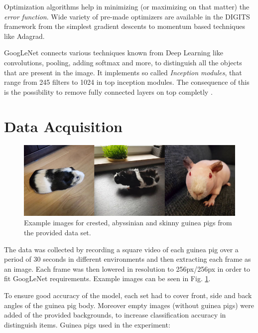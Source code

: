 \documentclass[10pt,journal,compsoc]{IEEEtran}
\begin{document}
    Optimization algorithms help in minimizing (or maximizing on that matter) the \textit{error function}. Wide variety of pre-made optimizers are available in the DIGITS framework from the simplest gradient descents to momentum based techniques like Adagrad\cite{adagrad}.

    GoogLeNet connects various techniques known from Deep Learning like convolutions, pooling, adding softmax and more\cite{fcn}, to distinguish all the objects that are present in the image. It implements so called \textit{Inception modules}, that range from 245 filters to 1024 in top inception modules. The consequence of this is the possibility to remove fully connected layers on top completly \cite{inception}.

    \section{Data Acquisition}

    \begin{figure}[h]
        \includegraphics[width=\linewidth]{pig_dataset.png}
        \caption{Example images for crested, abyssinian and skinny guinea pigs from the provided data set.}
        \label{fig:pigs}
        \centering
    \end{figure}

    The data was collected by recording a square video of each guinea pig over a period of 30 seconds in different environments and then extracting each frame as an image. Each frame was then lowered in resolution to 256px/256px in order to fit GoogLeNet requirements. Example images can be seen in Fig. \ref{fig:pigs}.

    To ensure good accuracy of the model, each set had to cover front, side and back angles of the guinea pig body. Moreover empty images (without guinea pigs) were added of the provided backgrounds, to increase classification accuracy in distinguish items.
    \newline\newline
    Guinea pigs used in the experiment:
\end{document}
